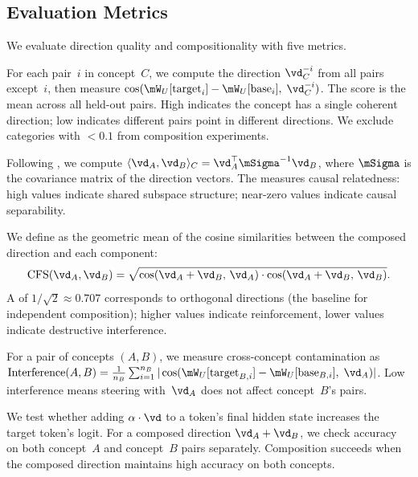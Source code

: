 \subsection{Evaluation Metrics}
\label{sec:metrics}

We evaluate direction quality and compositionality with five metrics.

For each pair~$i$ in concept~$C$, we compute the direction $\vd_C^{-i}$ from all pairs except~$i$, then measure $\cos(\Wu[\text{target}_i] - \Wu[\text{base}_i],\; \vd_C^{-i})$.
The \loo score is the mean across all held-out pairs.
High \loo indicates the concept has a single coherent direction; low \loo indicates different pairs point in different directions.
We exclude categories with \loo $< 0.1$ from composition experiments.

Following \citet{park2024linear}, we compute $\langle \vd_A, \vd_B \rangle_C = \vd_A^\top \mSigma^{-1} \vd_B$, where $\mSigma$ is the covariance matrix of the direction vectors.
The \cip measures causal relatedness: high values indicate shared subspace structure; near-zero values indicate causal separability.

We define \cfs as the geometric mean of the cosine similarities between the composed direction and each component:
\begin{equation}
\label{eq:cfs}
\text{CFS}(\vd_A, \vd_B) = \sqrt{\cos(\vd_A + \vd_B,\, \vd_A) \cdot \cos(\vd_A + \vd_B,\, \vd_B)}.
\end{equation}
A \cfs of $1/\sqrt{2} \approx 0.707$ corresponds to orthogonal directions (the baseline for independent composition); higher values indicate reinforcement, lower values indicate destructive interference.

For a pair of concepts $(A, B)$, we measure cross-concept contamination as $\text{Interference}(A, B) = \frac{1}{n_B}\sum_{i=1}^{n_B} |\cos(\Wu[\text{target}_{B,i}] - \Wu[\text{base}_{B,i}],\; \vd_A)|$.
Low interference means steering with~$\vd_A$ does not affect concept~$B$'s pairs.

We test whether adding $\alpha \cdot \vd$ to a token's final hidden state increases the target token's logit.
For a composed direction $\vd_A + \vd_B$, we check accuracy on both concept~$A$ and concept~$B$ pairs separately.
Composition succeeds when the composed direction maintains high accuracy on both concepts.

